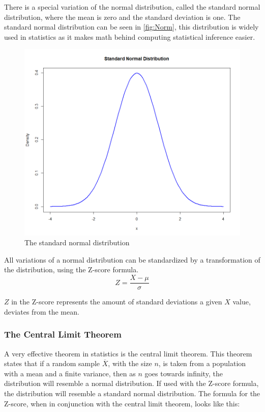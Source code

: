 \noindent There is a special variation of the normal distribution, called the standard normal distribution, where the mean is zero and the standard deviation is one. The standard normal distribution can be seen in \autoref{fig:Norm}, this distribution is widely used in statistics as it makes math behind computing statistical inference easier.
\begin{figure}[h!]
	\centering
	\begin{minipage}{0.80\textwidth}
		\centering
		\includegraphics[width=\linewidth]{billder/Normal distribution.png}
		\caption{The standard normal distribution}
		\label{fig:Norm}
	\end{minipage}\hfill
\end{figure}
All variations of a normal distribution can be standardized by a transformation of the distribution, using the Z-score formula.
\newline
\begin{equation}
Z=\frac{X-\mu}{\sigma}
\end{equation}


\noindent $Z$ in the Z-score represents the amount of standard deviations a given $X$ value, deviates from the mean.

\subsubsection{The Central Limit Theorem}
A very effective theorem in statistics is the central limit theorem. This theorem states that if a random sample $\overline{X}$, with the size $n$, is taken from a population with a mean and a finite variance, then as $n$ goes towards infinity, the distribution will resemble a normal distribution. If used with the Z-score formula, the distribution will resemble a standard normal distribution. The formula for the Z-score, when in conjunction with the central limit theorem, looks like this:

